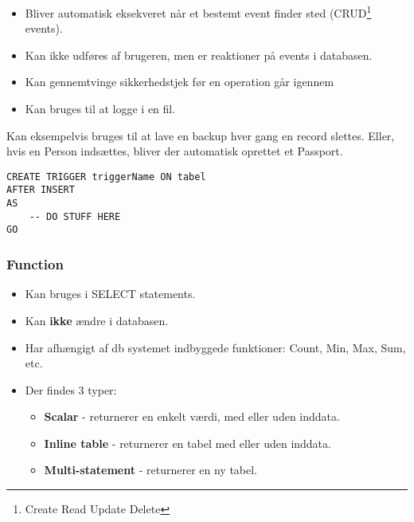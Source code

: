 \begin{itemize}
	\item Bliver automatisk eksekveret når et bestemt event finder sted (CRUD\footnote{Create Read Update Delete} events).
	\item Kan ikke udføres af brugeren, men er reaktioner på events i databasen.
	\item Kan gennemtvinge sikkerhedstjek før en operation går igennem
	\item Kan bruges til at logge i en fil.
%	
\end{itemize}

Kan eksempelvis bruges til at lave en backup hver gang en record slettes. Eller, hvis en Person indsættes, bliver der automatisk oprettet et Passport.

\begin{lstlisting}[caption=Kodeeksempel for Trigger]
CREATE TRIGGER triggerName ON tabel
AFTER INSERT
AS
	-- DO STUFF HERE
GO
\end{lstlisting}

\subsubsection{Function}

\begin{itemize}
	\item Kan bruges i SELECT statements.
	\item Kan \textbf{ikke} ændre i databasen.
	\item Har afhængigt af db systemet indbyggede funktioner: Count, Min, Max, Sum, etc.
	\item Der findes 3 typer:
	
	\begin{itemize}
		\item \textbf{Scalar} - returnerer en enkelt værdi, med eller uden inddata\todo.
		\item \textbf{Inline table} - returnerer en tabel med eller uden inddata.
		\item \textbf{Multi-statement} - returnerer en ny tabel.
	\end{itemize}
\end{itemize}

